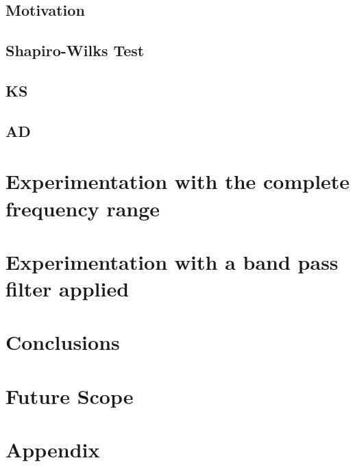 \documentclass[12pt]{article}
\begin{document}
\subsection{Motivation}
\subsection{Shapiro-Wilks Test}
\subsection{KS}
\subsection{AD}
\section{Experimentation with the complete frequency range}\label{Experiment_1}
\section{Experimentation with a band pass filter applied}\label{Experiment_2}


\section{Conclusions}\label{Conclusions}

\section{Future Scope}\label{Future Scope}

\section{Appendix}\label{Appendix}




\end{document}
